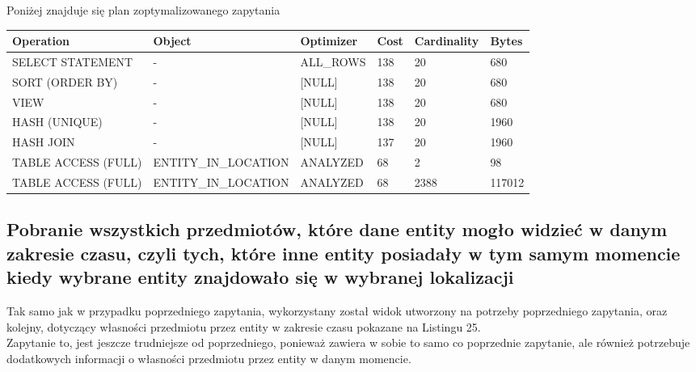 \documentclass[11pt]{article}
\numberwithin{figure}{subsection}
\begin{document}
		Poniżej znajduje się plan zoptymalizowanego zapytania \\
		
		\begin{tabularx}{\textwidth}{|X|X|X|X|X|X|}
Operation&Object&Optimizer&Cost&Cardinality&Bytes\\ \hline
SELECT STATEMENT& - &ALL\_ROWS&138&20&680\\ \hline
SORT (ORDER BY)& - &[NULL]&138&20&680\\ \hline
VIEW& - &[NULL]&138&20&680\\ \hline
HASH (UNIQUE)& - &[NULL]&138&20&1960\\ \hline
HASH JOIN& - &[NULL]&137&20&1960\\ \hline
TABLE ACCESS (FULL)&ENTITY\_IN\_LOCATION&ANALYZED&68&2&98\\ \hline
TABLE ACCESS (FULL)&ENTITY\_IN\_LOCATION&ANALYZED&68&2388&117012\\ \hline
		\end{tabularx}
		

		
		
		
		
		
		
		
		
		
		
	
	\subsection{Pobranie wszystkich przedmiotów, które dane entity mogło widzieć
	w danym zakresie czasu, czyli tych, które inne entity posiadały w tym samym
	momencie kiedy wybrane entity znajdowało się w wybranej lokalizacji}
	
		Tak samo jak w przypadku poprzedniego zapytania, wykorzystany został
		widok utworzony na potrzeby poprzedniego zapytania, oraz kolejny,
		dotyczący własności przedmiotu przez entity w zakresie czasu pokazane na
		Listingu 25.
		\\
		Zapytanie to, jest jeszcze trudniejsze od poprzedniego, ponieważ zawiera
		w sobie to samo co poprzednie zapytanie, ale również potrzebuje
		dodatkowych informacji o własności przedmiotu przez entity w danym
		momencie.
			
\end{document}
